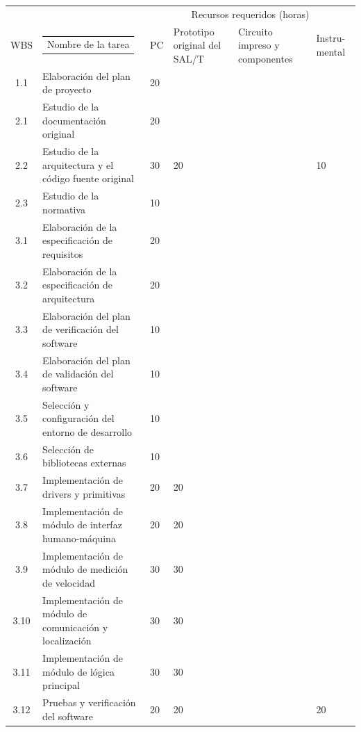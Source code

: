 \documentclass[11pt]{charter}
\begin{document}
\begin{table}[!htpb]
\begin{center}
  \begin{tabularx}{\linewidth}{@{}|c|X|m{0.8cm}|m{1.4cm}|m{1.3cm}|m{1.1cm}|@{}}
  \hline
  \cellcolor[HTML]{C0C0C0} & \cellcolor[HTML]{C0C0C0} & \multicolumn{4}{c|}{\cellcolor[HTML]{C0C0C0}Recursos requeridos (horas)} \\ \cline{3-6} 
  \multirow{-2}{*}{\cellcolor[HTML]{C0C0C0}WBS} & \multirow{-2}{*}{\cellcolor[HTML]{C0C0C0}\begin{tabular}[c]{@{}c@{}}Nombre de la tarea\end{tabular}} & PC & Prototipo original del SAL/T & Circuito impreso y componentes & Instru- mental \\ \hline
  1.1 & Elaboración del plan de proyecto & 20 & & & \\ \hline
  2.1 & Estudio de la documentación original & 20 & & & \\ \hline
  2.2 & Estudio de la arquitectura y el código fuente original & 30 & 20 & & 10 \\ \hline
  2.3 & Estudio de la normativa & 10 & & & \\ \hline
  3.1 & Elaboración de la especificación de requisitos & 20 & & & \\ \hline
  3.2 & Elaboración de la especificación de arquitectura & 20 & & & \\ \hline
  3.3 & Elaboración del plan de verificación del software & 10 & & & \\ \hline
  3.4 & Elaboración del plan de validación del software & 10 & & & \\ \hline
  3.5 & Selección y configuración del entorno de desarrollo & 10 & & & \\ \hline
  3.6 & Selección de bibliotecas externas & 10 & & & \\ \hline
  3.7 & Implementación de drivers y primitivas & 20 & 20 & & \\ \hline
  3.8 & Implementación de módulo de interfaz humano-máquina & 20 & 20 & & \\ \hline
  3.9  & Implementación de módulo de medición de velocidad & 30 & 30 & & \\ \hline
  3.10 & Implementación de módulo de comunicación y localización & 30 & 30 & & \\ \hline
  3.11 & Implementación de módulo de lógica principal & 30 & 30 & & \\ \hline
  3.12 & Pruebas y verificación del software & 20 & 20 & & 20 \\ \hline

\end{tabularx}
\end{center}
\end{table}
\end{document}
